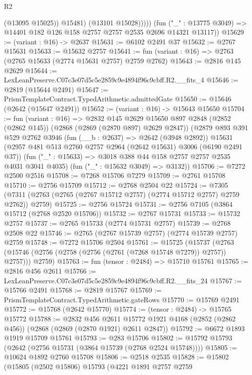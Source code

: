 \begin{lexlean}{R2}
\begin{coremodule}
                  (@13095 @15025))
                @15481)
              (@13101 @15028)))))
      (fun ("_" : @13775 @3049) => @14401 @182 @126 @158 @2757 @2757 @2535 @2696 @14321 @13117))
@15629 := (variant : @16) -> @2637
@15631 := @6102 @2491 @37
@15632 := @2767 @15631
@15633 := @15632 @2757
@15641 := fun (variant : @16) => @2763 (@2765 @15633 (@2774 @15631 @2757) @2759 @2762)
@15643 := @2816 @145 @2629
@15644 := LexLeanPreserve.C07c3e07d5c5e2859c9e4894f96c9cbff.R2.__fits_4
@15646 := @2819 (@15644 @2491)
@15647 := PrismTemplateContract.TypedArithmetic.admittedGate
@15650 := @15646 (@2642 (@15647 @2491))
@15652 := (variant : @16) -> @15643 @15650
@15704 := fun (variant : @16) =>
  @2832
    @145
    @2629
    @15650
    @897
    @2848
    (@2852 (@2862 @145))
    (@2868 (@2869 (@2870 @897) @2629 @2847))
    (@2879
      @893
      @391
      @529
      @2762
      @3946
      (fun (__b : @2637) => @2642 (@3948 @2892))
      @15631
      (@2957 @481 @513 @2760 @2757 @2964 (@2642 @15631) @3006 (@6190 @2491 @37))
      (fun ("_" : @15633) => @3018 @388 @44 @158 @2757 @2757 @2535 @4031 @3041 @4035)
      (fun ("_" : @15632 @3049) => @3132))
@15706 := @7272 @2500 @2516
@15708 := @7268 @15706 @7279
@15709 := @2761 @15708
@15710 := @2756 @15709
@15712 := @2768 @2504 @22
@15724 := @7305 (@7311 (@2763 (@2765 (@2767 @15712 @2757) (@2774 @15712 @2757) @2759 @2762)) @2759)
@15725 := @2756 @15724
@15731 := @2756 @7105 (@3864 @15712 (@2768 @2520 @15706))
@15732 := @2767 @15731
@15733 := @15732 @2757
@15737 := @2765 @15733 (@2774 @15731 @2757)
@15739 := @2768 @2508 @22
@15746 := @2765 (@2767 @15739 @2757) (@2774 @15739 @2757) @2759
@15748 := @7272 @15706 @2504
@15761 := @15725
    (@15737 (@2763 (@15746 (@2756 (@2758 (@2756 (@2761 (@7268 @15748 @7279)) @2757)) @2757))) @2759)
@15763 := fun (tensor : @2484) => @15710 @15761
@15765 := @2816 @456 @2611
@15766 := LexLeanPreserve.C07c3e07d5c5e2859c9e4894f96c9cbff.R2.__fits_24
@15767 := @15766 @2491
@15768 := @2819 @15767
@15769 := PrismTemplateContract.TypedArithmetic.gateRows
@15770 := @15769 @2491
@15772 := @15768 (@2642 @15770)
@15774 := (tensor : @2484) -> @15765 @15772
@15788 := @2832
    @456
    @2611
    @15772
    @1921
    @4168
    (@2852 (@2862 @456))
    (@2868 (@2869 (@2870 @1921) @2611 @2847))
@15792 := @6672 @1893 @1919 @15709 @15761
@15793 := @283 @15706
@15802 := @15792 @15793 (@2642 (@2756 @15731 (@3864 @15739 (@2768 @2524 @15748))))
@15805 := @10624 @1892 @2760 @15708
@15806 := @2518 @2535
@15828 := @15802
    (@15805
      (@2502 @15806)
      @15793
      (@4221
        @1891
        @2757
        @2759

\end{coremodule}
\end{lexlean}
